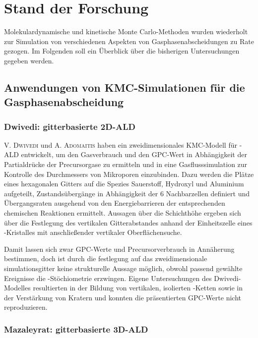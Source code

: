 \section{Stand der Forschung}
\label{present}

Molekulardynamische und kinetische Monte Carlo-Methoden wurden wiederholt zur Simulation von verschiedenen Aspekten von Gasphasenabscheidungen zu Rate gezogen.
Im Folgenden soll ein Überblick über die bisherigen Untersuchungen gegeben werden.

\subsection{Anwendungen von KMC-Simulationen für die Gasphasenabscheidung}

\subsubsection{Dwivedi: gitterbasierte 2D-ALD}

\textsc{V. Dwivedi} und \textsc{A. Adomaitis} haben ein zweidimensionales KMC-Modell für -ALD entwickelt\cite{dwivedi_multiscale_2009,dwivedi_multiscale_2009-1,dwivedi_multiscale_2010}, um den Gasverbrauch und den GPC-Wert in Abhängigkeit der Partialdrücke der Precursorgase zu ermitteln und in eine Gasflusssimulation zur Kontrolle des Durchmessers von Mikroporen einzubinden.
Dazu werden die Plätze eines hexagonalen Gitters auf die Spezies Sauerstoff, Hydroxyl und Aluminium aufgeteilt, Zustandsübergänge in Abhängigkeit der 6 Nachbarzellen definiert und Übergangsraten ausgehend von den Energiebarrieren der entsprechenden chemischen Reaktionen ermittelt.
Aussagen über die Schichthöhe ergeben sich über die Festlegung des vertikalen Gitterabstandes anhand der Einheitszelle eines -Kristalles mit anschließender vertikaler Oberflächensuche.

Damit lassen sich zwar GPC-Werte und Precursorverbrauch in Annäherung bestimmen, doch ist durch die festlegung auf das zweidimensionale simulationsgitter keine strukturelle Aussage möglich, obwohl passend gewählte Ereignisse die -Stöchiometrie erzwingen.
Eigene Untersuchungen des Dwivedi-Modelles resultierten in der Bildung von vertikalen, isolierten -Ketten sowie in der Verstärkung von Kratern und konnten die präsentierten GPC-Werte nicht reproduzieren.

\subsubsection{Mazaleyrat: gitterbasierte 3D-ALD}

